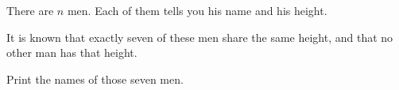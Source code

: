There are $n$ men. Each of them tells you his name and his height.

It is known that exactly seven of these men share the same height, and that no other man has that height.

Print the names of those seven men.
